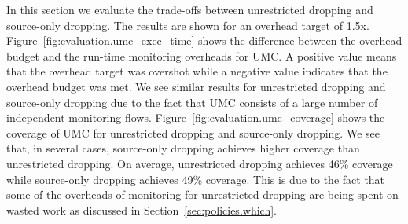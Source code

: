 In this section we evaluate the trade-offs between unrestricted dropping and source-only dropping.
The results are shown for an overhead target of 1.5x.
Figure~\ref{fig:evaluation.umc_exec_time} shows the difference between the
overhead budget and the run-time monitoring overheads for UMC. A positive value
means that the overhead target was overshot while a negative value indicates
that the overhead budget was met. We see similar results for unrestricted
dropping and source-only dropping due to the fact that UMC consists of a large
number of independent monitoring flows.
Figure~\ref{fig:evaluation.umc_coverage} shows the coverage of UMC for
unrestricted dropping and source-only dropping. We see that, in several cases, source-only dropping
achieves higher coverage than unrestricted dropping. On average, unrestricted
dropping achieves 46\% coverage while source-only dropping achieves 49\%
coverage. This is due
to the fact that some of the overheads of monitoring for unrestricted dropping
are being spent on wasted work as discussed in Section~\ref{sec:policies.which}.

% 

